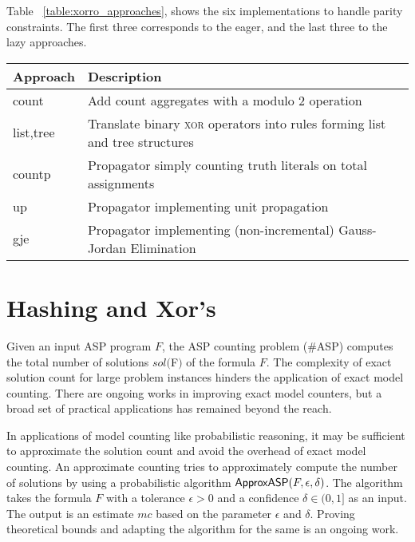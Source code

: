 \documentclass{article}
\def\asp{\textsf{\#ASP}\xspace}
\newcommand{\XOR}{\textsc{xor}} %
\newcommand{\fff}{$F$\xspace}
\newcommand{\mc}{$mc$\xspace}
\newcommand{\ep}{\epsilon\xspace}
\newcommand{\del}{\delta\xspace}
\def\appasp{\normalfont \textsf{ApproxASP}\xspace}
\newcommand{\sysfont}{\textit}
\newcommand{\xorro}{\sysfont{xorro}}
\begin{document}
Table~ \ref{table:xorro_approaches}, shows the six implementations to handle parity constraints.
The first three corresponds to the eager, and the last three to the lazy approaches.



\begin{table*}[t]
	\caption{\xorro{} approaches to handle parity constraints}\label{table:xorro_approaches}
	\begin{tabular}{ l|l }
		Approach  & Description  \\
		\hline\hline
		count     & Add count aggregates with a modulo 2 operation  \\
		list,tree & Translate binary \XOR{} operators into rules forming list and tree structures \\
		countp    & Propagator simply counting truth literals on total assignments\\
		up        & Propagator implementing unit propagation\\
		gje       & Propagator implementing (non-incremental) Gauss-Jordan Elimination

	\end{tabular}
\end{table*}
%

\section{Hashing and Xor's} \label{sec:hashing}
Given an input ASP program \fff, the ASP counting problem (\asp) computes the total number of solutions $sol(\fff)$ of the formula \fff.
%
The complexity of exact solution count for large problem instances hinders the application of exact model counting.
%
There are ongoing works \cite{bibid} in improving exact model counters, but a broad set of practical applications has remained beyond the reach. 
%


In applications of model counting like probabilistic reasoning, it may be sufficient to approximate the solution count and avoid the overhead of exact model counting.
%
An approximate counting tries to approximately compute the number of solutions by using a probabilistic algorithm $\appasp(F, \epsilon, \delta)$.
%
The algorithm takes the formula \fff with a tolerance $\epsilon > 0$ and a confidence $\delta \in (0, 1]$ as an input.
%
The output is an estimate \mc based on the parameter $\ep$ and $\del$.
%
Proving theoretical bounds and adapting the algorithm for the same is an ongoing work.
\end{document}
